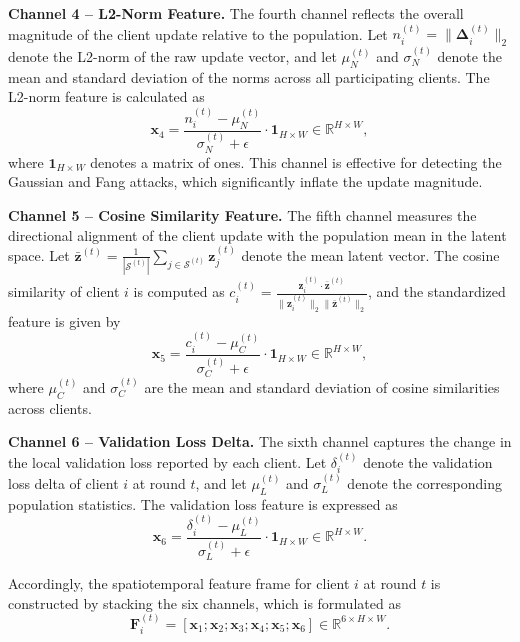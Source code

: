 \textbf{Channel 4 -- L2-Norm Feature.} The fourth channel reflects the overall magnitude of the client update relative to the population. Let $n_i^{(t)} = \|\boldsymbol{\Delta}_i^{(t)}\|_2$ denote the L2-norm of the raw update vector, and let $\mu_N^{(t)}$ and $\sigma_N^{(t)}$ denote the mean and standard deviation of the norms across all participating clients. The L2-norm feature is calculated as
\begin{equation}\label{eq:ch4}
    \mathbf{x}_4 = \frac{n_i^{(t)} - \mu_N^{(t)}}{\sigma_N^{(t)} + \epsilon} \cdot \mathbf{1}_{H \times W} \in \mathbb{R}^{H \times W},
\end{equation}
where $\mathbf{1}_{H \times W}$ denotes a matrix of ones. This channel is effective for detecting the Gaussian and Fang attacks, which significantly inflate the update magnitude.

\textbf{Channel 5 -- Cosine Similarity Feature.} The fifth channel measures the directional alignment of the client update with the population mean in the latent space. Let $\bar{\mathbf{z}}^{(t)} = \frac{1}{|\mathcal{S}^{(t)}|} \sum_{j \in \mathcal{S}^{(t)}} \mathbf{z}_j^{(t)}$ denote the mean latent vector. The cosine similarity of client $i$ is computed as $c_i^{(t)} = \frac{\mathbf{z}_i^{(t)} \cdot \bar{\mathbf{z}}^{(t)}}{\|\mathbf{z}_i^{(t)}\|_2 \|\bar{\mathbf{z}}^{(t)}\|_2}$, and the standardized feature is given by
\begin{equation}\label{eq:ch5}
    \mathbf{x}_5 = \frac{c_i^{(t)} - \mu_C^{(t)}}{\sigma_C^{(t)} + \epsilon} \cdot \mathbf{1}_{H \times W} \in \mathbb{R}^{H \times W},
\end{equation}
where $\mu_C^{(t)}$ and $\sigma_C^{(t)}$ are the mean and standard deviation of cosine similarities across clients.

\textbf{Channel 6 -- Validation Loss Delta.} The sixth channel captures the change in the local validation loss reported by each client. Let $\delta_i^{(t)}$ denote the validation loss delta of client $i$ at round $t$, and let $\mu_L^{(t)}$ and $\sigma_L^{(t)}$ denote the corresponding population statistics. The validation loss feature is expressed as
\begin{equation}\label{eq:ch6}
    \mathbf{x}_6 = \frac{\delta_i^{(t)} - \mu_L^{(t)}}{\sigma_L^{(t)} + \epsilon} \cdot \mathbf{1}_{H \times W} \in \mathbb{R}^{H \times W}.
\end{equation}

Accordingly, the spatiotemporal feature frame for client $i$ at round $t$ is constructed by stacking the six channels, which is formulated as
\begin{equation}\label{eq:frame}
    \mathbf{F}_i^{(t)} = \left[\mathbf{x}_1; \mathbf{x}_2; \mathbf{x}_3; \mathbf{x}_4; \mathbf{x}_5; \mathbf{x}_6\right] \in \mathbb{R}^{6 \times H \times W}.
\end{equation}

